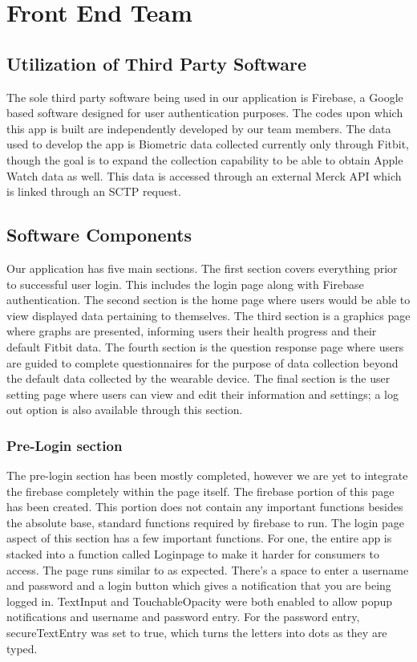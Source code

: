 \documentclass[]{book}
\begin{document}
\chapter{Front End Team}\label{front-end-team}

\section{Utilization of Third Party
Software}\label{utilization-of-third-party-software}

The sole third party software being used in our application is Firebase,
a Google based software designed for user authentication purposes. The
codes upon which this app is built are independently developed by our
team members. The data used to develop the app is Biometric data
collected currently only through Fitbit, though the goal is to expand
the collection capability to be able to obtain Apple Watch data as well.
This data is accessed through an external Merck API which is linked
through an SCTP request.

\section{Software Components}\label{software-components}

Our application has five main sections. The first section covers
everything prior to successful user login. This includes the login page
along with Firebase authentication. The second section is the home page
where users would be able to view displayed data pertaining to
themselves. The third section is a graphics page where graphs are
presented, informing users their health progress and their default
Fitbit data. The fourth section is the question response page where
users are guided to complete questionnaires for the purpose of data
collection beyond the default data collected by the wearable device. The
final section is the user setting page where users can view and edit
their information and settings; a log out option is also available
through this section.

\subsection{Pre-Login section}\label{pre-login-section}

The pre-login section has been mostly completed, however we are yet to
integrate the firebase completely within the page itself. The firebase
portion of this page has been created. This portion does not contain any
important functions besides the absolute base, standard functions
required by firebase to run. The login page aspect of this section has a
few important functions. For one, the entire app is stacked into a
function called Loginpage to make it harder for consumers to access. The
page runs similar to as expected. There's a space to enter a username
and password and a login button which gives a notification that you are
being logged in. TextInput and TouchableOpacity were both enabled to
allow popup notifications and username and password entry. For the
password entry, secureTextEntry was set to true, which turns the letters
into dots as they are typed.
\end{document}
